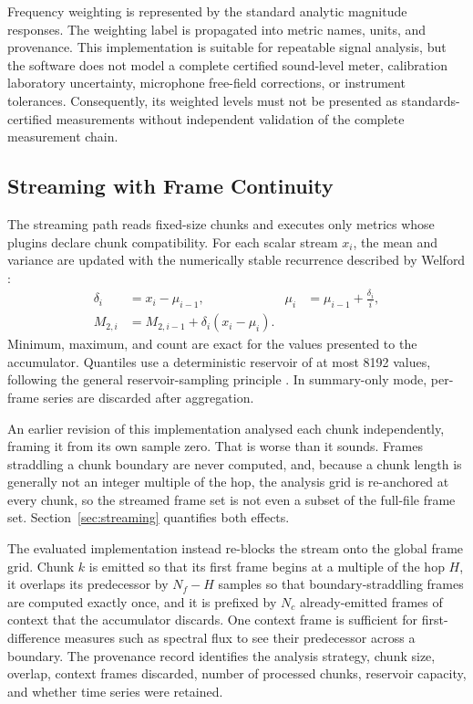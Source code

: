 \documentclass[final]{jaes}
\begin{document}
Frequency weighting is represented by the standard analytic magnitude responses. The weighting label is propagated into metric names, units, and provenance. This implementation is suitable for repeatable signal analysis, but the software does not model a complete certified sound-level meter, calibration laboratory uncertainty, microphone free-field corrections, or instrument tolerances. Consequently, its weighted levels must not be presented as standards-certified measurements without independent validation of the complete measurement chain.

\subsection{Streaming with Frame Continuity}
\label{sec:streaming-design}

The streaming path reads fixed-size chunks and executes only metrics whose plugins declare chunk compatibility. For each scalar stream $x_i$, the mean and variance are updated with the numerically stable recurrence described by Welford \cite{welford1962}:
\begin{equation}
\begin{aligned}
\delta_i &= x_i-\mu_{i-1}, &
\mu_i &= \mu_{i-1}+\frac{\delta_i}{i},\\
M_{2,i} &= M_{2,i-1}+\delta_i(x_i-\mu_i).&&
\end{aligned}
\label{eq:welford}
\end{equation}
Minimum, maximum, and count are exact for the values presented to the accumulator. Quantiles use a deterministic reservoir of at most 8192 values, following the general reservoir-sampling principle \cite{vitter1985}. In summary-only mode, per-frame series are discarded after aggregation.

An earlier revision of this implementation analysed each chunk independently, framing it from its own sample zero. That is worse than it sounds. Frames straddling a chunk boundary are never computed, and, because a chunk length is generally not an integer multiple of the hop, the analysis grid is re-anchored at every chunk, so the streamed frame set is not even a subset of the full-file frame set. Section~\ref{sec:streaming} quantifies both effects.

The evaluated implementation instead re-blocks the stream onto the global frame grid. Chunk $k$ is emitted so that its first frame begins at a multiple of the hop $H$, it overlaps its predecessor by $N_f-H$ samples so that boundary-straddling frames are computed exactly once, and it is prefixed by $N_c$ already-emitted frames of context that the accumulator discards. One context frame is sufficient for first-difference measures such as spectral flux to see their predecessor across a boundary. The provenance record identifies the analysis strategy, chunk size, overlap, context frames discarded, number of processed chunks, reservoir capacity, and whether time series were retained.
\end{document}
